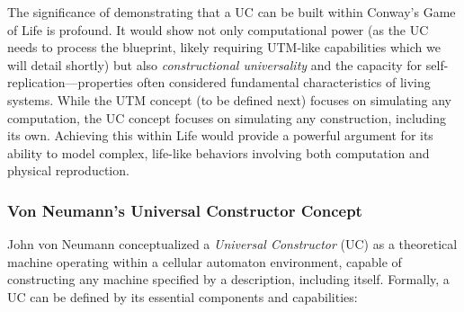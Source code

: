 \documentclass{article}
\theoremstyle{definition}
\theoremstyle{plain}
\theoremstyle{plain}
\begin{document}
The significance of demonstrating that a UC can be built within Conway's Game of Life is profound. It would show not only computational power (as the UC needs to process the blueprint, likely requiring UTM-like capabilities which we will detail shortly) but also \textit{constructional universality} and the capacity for self-replication—properties often considered fundamental characteristics of living systems. While the UTM concept (to be defined next) focuses on simulating any computation, the UC concept focuses on simulating any construction, including its own. Achieving this within Life would provide a powerful argument for its ability to model complex, life-like behaviors involving both computation and physical reproduction.

\subsubsection{Von Neumann's Universal Constructor Concept}
John von Neumann conceptualized a \textit{Universal Constructor} (UC) as a theoretical machine operating within a cellular automaton environment, capable of constructing any machine specified by a description, including itself. Formally, a UC can be defined by its essential components and capabilities:
\end{document}

